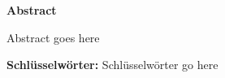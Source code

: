 \newpage

\vspace*{150pt}

\begin{center}
    {\sffamily
        \textbf{Abstract}
    }
\end{center}

Abstract goes here

\vspace*{20pt}

{\sffamily \textbf{Schlüsselwörter:}} Schlüsselwörter go here